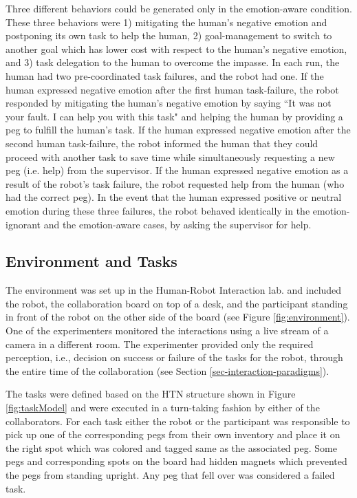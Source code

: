 \documentclass[12pt]{report}
\begin{document}
Three different behaviors could be generated only in the emotion-aware
condition. These three behaviors were 1) mitigating the human's negative emotion
and postponing its own task to help the human, 2) goal-management to switch to
another goal which has lower cost with respect to the human's negative emotion,
and 3) task delegation to the human to overcome the impasse. In each run, the
human had two pre-coordinated task failures, and the robot had one. If the human
expressed negative emotion after the first human task-failure, the robot
responded by mitigating the human's negative emotion by saying  ``It was not
your fault. I can help you with this task" and helping the human by providing a
peg to fulfill the human's task. If the human expressed negative emotion after
the second human task-failure, the robot informed the human that they could
proceed with another task to save time while simultaneously requesting a new peg
(i.e. help) from the supervisor. If the human expressed negative emotion as a
result of the robot's task failure, the robot requested help from the human (who
had the correct peg). In the event that the human expressed positive or neutral
emotion during these three failures, the robot behaved identically in the
emotion-ignorant and the emotion-aware cases, by asking the supervisor for help. 

\subsection{Environment and Tasks}

The environment was set up in the Human-Robot Interaction lab. and included the
robot, the collaboration board on top of a desk, and the participant standing in
front of the robot on the other side of the board (see Figure
\ref{fig:environment}). One of the experimenters monitored the interactions
using a live stream of a camera in a different room. The experimenter provided
only the required perception, i.e., decision on success or failure of the tasks
for the robot, through the entire time of the collaboration (see Section
\ref{sec-interaction-paradigms}).

The tasks were defined based on the HTN structure shown in Figure
\ref{fig:taskModel} and were executed in a turn-taking fashion by either of the
collaborators. For each task either the robot or the participant was responsible
to pick up one of the corresponding pegs from their own inventory and place it
on the right spot which was colored and tagged same as the associated peg. Some
pegs and corresponding spots on the board had hidden magnets which prevented the
pegs from standing upright. Any peg that fell over was considered a failed task. 
\end{document}

